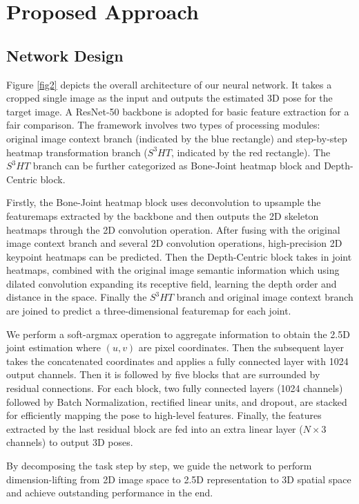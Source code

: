 \documentclass[letterpaper]{article} \usepackage{aaai21}  \usepackage{times}  \usepackage{helvet} \usepackage{courier}  \usepackage[hyphens]{url}  \usepackage{graphicx} \urlstyle{rm} \def\UrlFont{\rm}  \usepackage{natbib}  \usepackage{caption} \frenchspacing  \setlength{\pdfpagewidth}{8.5in}  \setlength{\pdfpageheight}{11in}
\begin{document}
\section{Proposed Approach}



\subsection{Network Design}
\label{sec1}
Figure \ref{fig2} depicts the overall architecture of our neural network. It takes a cropped single image as the input and outputs the estimated 3D pose for the target image. A ResNet-50 \cite{he2016deep} backbone is adopted for basic feature extraction for a fair comparison. The framework involves two types of processing modules: original image context branch (indicated by the blue rectangle) and step-by-step heatmap transformation branch ($S^3HT$, indicated by the red rectangle). The $S^3HT$ branch can be further categorized as Bone-Joint heatmap block and Depth-Centric block. 

Firstly, the Bone-Joint heatmap block uses deconvolution to upsample the featuremaps extracted by the backbone and then outputs the 2D skeleton heatmaps through the 2D convolution operation. After fusing with the original image context branch and several 2D convolution operations, high-precision 2D keypoint heatmaps can be predicted. Then the Depth-Centric block takes in joint heatmaps, combined with the original image semantic information which using dilated convolution expanding its receptive field, learning the depth order and distance in the space. Finally the $S^3HT$ branch and original image context branch are joined to predict a three-dimensional featuremap for each joint. 

We perform a soft-argmax operation \cite{sun2018integral} to aggregate information to obtain the 2.5D joint estimation where $(u,v)$ are pixel coordinates. Then the subsequent layer takes the concatenated coordinates and applies a fully connected layer with 1024 output channels. Then it is followed by five blocks that are surrounded by residual connections. For each block, two fully connected layers (1024 channels) followed by Batch Normalization, rectified linear units, and dropout, are stacked for efficiently mapping the pose to high-level features. Finally, the features extracted by the last residual block are fed into an extra linear layer ($N\times3$ channels) to output 3D poses. 

By decomposing the task step by step, we guide the network to perform dimension-lifting from 2D image space to 2.5D representation to 3D spatial space and achieve outstanding performance in the end.
\end{document}
